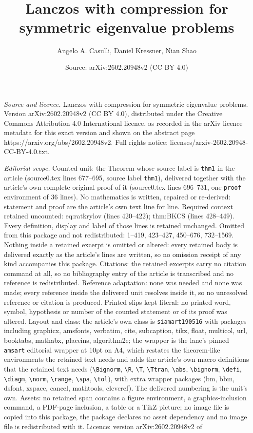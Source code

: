 \documentclass[10pt,a4paper]{amsart}
\title[Lanczos with compression for symmetric eigenvalue problems]{Lanczos with compression for symmetric eigenvalue problems}
\author{Angelo A. Casulli, Daniel Kressner, Nian Shao}
\date{Source: arXiv:2602.20948v2 (CC BY 4.0)}
\begin{document}
\maketitle

\noindent\emph{Source and licence.} Lanczos with compression for symmetric eigenvalue problems. Version arXiv:2602.20948v2 (CC BY 4.0), distributed under the Creative Commons Attribution 4.0 International licence, as recorded in the arXiv licence metadata for this exact version and shown on the abstract page https://arxiv.org/abs/2602.20948v2. Full rights notice: licenses/arxiv-2602.20948-CC-BY-4.0.txt.\par\smallskip

\noindent\textit{Editorial scope.} Counted unit: the Theorem whose source label is \texttt{thm1} in the article (source0.tex lines 677--695, source label \texttt{thm1}), delivered together with the article's own complete original proof of it (source0.tex lines 696--731, one \texttt{proof} environment of 36 lines). No mathematics is written, repaired or re-derived: statement and proof are the article's own text line for line. Required context retained uncounted: eq:ratkrylov (lines 420--422); thm:BKCS (lines 428--449). Every definition, display and label of those lines is retained unchanged. Omitted from this package and not redistributed: 1--419, 423--427, 450--676, 732--1569. Nothing inside a retained excerpt is omitted or altered: every retained body is delivered exactly as the article's lines are written, so no omission receipt of any kind accompanies this package. Citations: the retained excerpts carry no citation command at all, so no bibliography entry of the article is transcribed and no reference is redistributed. Reference adaptation: none was needed and none was made; every reference inside the delivered unit resolves inside it, so no unresolved reference or citation is produced. Printed slips kept literal: no printed word, symbol, hypothesis or number of the counted statement or of its proof was altered. Layout and class: the article's own class is \texttt{siamart190516} with packages including graphicx, amsfonts, verbatim, cite, subcaption, tikz, float, multicol, url, booktabs, mathabx, placeins, algorithm2e; the wrapper is the lane's pinned \texttt{amsart} editorial wrapper at 10pt on A4, which restates the theorem-like environments the retained text needs and adds the article's own macro definitions that the retained text needs (\texttt{\textbackslash Bignorm}, \texttt{\textbackslash R}, \texttt{\textbackslash T}, \texttt{\textbackslash Ttran}, \texttt{\textbackslash abs}, \texttt{\textbackslash bignorm}, \texttt{\textbackslash defi}, \texttt{\textbackslash diagm}, \texttt{\textbackslash norm}, \texttt{\textbackslash range}, \texttt{\textbackslash spa}, \texttt{\textbackslash tol}), with extra wrapper packages (bm, bbm, dsfont, xspace, cancel, mathtools, cleveref). The delivered numbering is the unit's own. Assets: no retained span contains a figure environment, a graphics-inclusion command, a PDF-page inclusion, a table or a TikZ picture; no image file is copied into this package, the package declares no asset dependency and no image file is redistributed with it. Licence: version arXiv:2602.20948v2 of 
\end{document}
